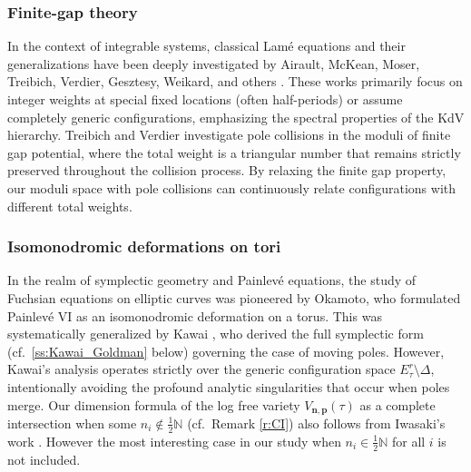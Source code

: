 \documentclass[11pt]{amsart}
\theoremstyle{remark}
\numberwithin{equation}{section}
\begin{document}
\subsubsection{Finite-gap theory} In the context of integrable systems, classical Lamé equations and their generalizations have been deeply investigated by Airault, McKean, Moser, Treibich, Verdier, Gesztesy, Weikard, and others \cite{Airault_McKean_Moser_1977, Treibich_Verdier_1992, Gesztesy_Weikard_Picard_1996,Gesztesy_Unterkofler_Karl_2006}. These works primarily focus on integer weights at special fixed locations (often half-periods) or assume completely generic configurations, emphasizing the spectral properties of the KdV hierarchy. Treibich and Verdier investigate pole collisions in the moduli of finite gap potential, where the total weight is a triangular number that remains strictly preserved throughout the collision process. By relaxing the finite gap property, our moduli space with pole collisions can continuously relate configurations with different total weights.

\subsubsection{Isomonodromic deformations on tori} In the realm of symplectic geometry and Painlevé equations, the study of Fuchsian equations on elliptic curves was pioneered by Okamoto, who formulated Painlevé VI as an isomonodromic deformation on a torus. This was systematically generalized by Kawai \cite{Kawai_1996}, who derived the full symplectic form (cf.~\ref{ss:Kawai_Goldman} below) governing the case of moving poles. However, Kawai's analysis operates strictly over the generic configuration space $E_\tau^r \setminus \Delta$, intentionally avoiding the profound analytic singularities that occur when poles merge. Our dimension formula of the log free variety $V_{\mathbf{n},\mathbf{p}}(\tau)$ as a complete intersection when some $n_i \not\in \tfrac12 \mathbb{N}$ (cf.~Remark \ref{r:CI}) also follows from Iwasaki's work \cite{Iwasaki_1991}. However the most interesting case in our study when $n_i \in \tfrac12 \mathbb{N}$ for all $i$ is not included.  
\end{document}

